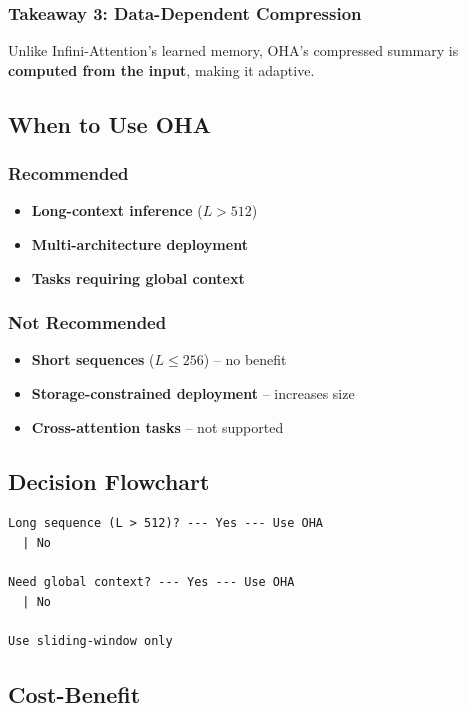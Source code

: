 \subsubsection{Takeaway 3: Data-Dependent Compression}

Unlike Infini-Attention's learned memory, OHA's compressed summary is 
\textbf{computed from the input}, making it adaptive.

\subsection{When to Use OHA}

\subsubsection{Recommended}

\begin{itemize}
\item \textbf{Long-context inference} ($L > 512$)
\item \textbf{Multi-architecture deployment}
\item \textbf{Tasks requiring global context}

\end{itemize}
\subsubsection{Not Recommended}

\begin{itemize}
\item \textbf{Short sequences} ($L \leq 256$) -- no benefit
\item \textbf{Storage-constrained deployment} -- increases size
\item \textbf{Cross-attention tasks} -- not supported

\end{itemize}
\subsection{Decision Flowchart}

\begin{lstlisting}
Long sequence (L > 512)? --- Yes --- Use OHA
  | No
   
Need global context? --- Yes --- Use OHA
  | No
   
Use sliding-window only
\end{lstlisting}

\subsection{Cost-Benefit}

